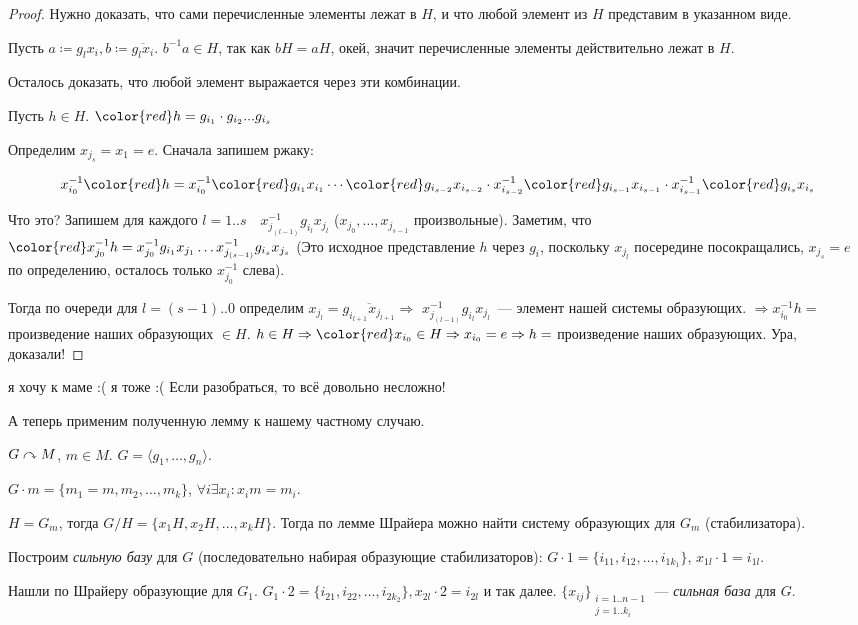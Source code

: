 \begin{proof}
    Нужно доказать, что сами перечисленные элементы лежат в $H$, и что любой элемент из $H$ представим в указанном виде.

    Пусть $a \coloneqq g_lx_i, b \coloneqq \overline{g_lx_i}$.  $b^{-1}a \in H$, так как  $bH=aH$, окей, значит перечисленные элементы действительно лежат в $H$.

    Осталось доказать, что любой элемент выражается через эти комбинации.

    Пусть  $h \in H$. ${\color{red}h} = g_{i_1} \cdot g_{i_2} ... g_{i_s}$

    Определим $x_{j_s} = x_1 = e$. Сначала запишем ржаку:

    {
\large
$$
x_{i_0}^{-1} {\color{red}h} = x_{i_0}^{-1} {\color{red}g_{i_1}} x_{i_1} \cdots {\color{red}g_{i_{s-2}}} x_{i_{s-2}} \cdot x_{i_{s-2}}^{-1} {\color{red} g_{i_{s-1}}} x_{i_{s-1}} \cdot x_{i_{s-1}}^{-1} {\color{red}g_{i_{s}}} x_{i_s}
$$
    }

    Что это? Запишем для каждого $l=1..s \quad x_{j_{(l-1)}}^{-1}g_{i_l}x_{j_l}$ ($x_{j_0}, \ldots, x_{j_{s-1}}$ произвольные). Заметим, что  ${\color{red}x_{j_0}^{-1}h} = x_{j_0}^{-1}g_{i_1} x_{j_1} \ldots x_{j_{(s - 1)}}^{-1} g_{i_s} x_{j_s}$ (Это исходное представление $h$ через $g_i$, поскольку $x_{j_l}$ посередине посокращались, $x_{j_s} = e$ по определению, осталось только $x_{j_0}^{-1}$ слева).

    Тогда по очереди для $l=(s\!-\!1)..0$ определим $x_{j_l} = \overline{g_{i_{l+1}} x_{j_{l+1}}} \Rightarrow$ {\color{blue}$x_{j_{(l-1)}}^{-1}g_{i_{l}} x_{j_{l}}$}~--- элемент нашей системы образующих.
    $\Rightarrow x_{i_0}^{-1}h = $ произведение наших образующих $\in H$.
    $h \in H \Rightarrow {\color{red}x_{i_0} \in H} \Rightarrow x_{i_0} = e \Rightarrow h = $ произведение наших образующих. Ура, доказали!
\end{proof}

я хочу к маме :( я тоже :( Если разобраться, то всё довольно несложно!

А теперь применим полученную лемму к нашему частному случаю.

\begin{exerc}
    $G \curvearrowright M$,  $m \in M$.  $G = \langle g_1, \ldots, g_n\rangle$.

    $G \cdot m = \{ m_1=m,  m_2, \ldots, m_k\}$, $\forall i \exists x_i\!: x_im = m_i$.

     $H = G_m$, тогда  $G / H = \{x_1H, x_2H, \ldots, x_k H\}$. Тогда по лемме Шрайера можно найти систему образующих для $G_m$ (стабилизатора).

     Построим \textit{сильную базу} для $G$ (последовательно набирая образующие стабилизаторов):  $G \cdot 1 = \{i_{11}, i_{12}, \ldots, i_{1k_1}\}$, $x_{1l} \cdot 1 = i_{1l}$.

     Нашли по Шрайеру образующие для  $G_1$. $G_1 \cdot 2 = \{ i_{21}, i_{22}, \ldots, i_{2k_2}\}, x_{2l} \cdot 2 = i_{2l}$ и так далее. $\{x_{ij}\}_{\substack{i=1..n-1\\j=1..k_i}}$ --- \textit{сильная база} для  $G$.
\end{exerc}

